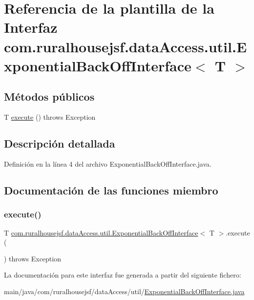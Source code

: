 \hypertarget{a00160}{}\section{Referencia de la plantilla de la Interfaz com.\+ruralhousejsf.\+data\+Access.\+util.\+Exponential\+Back\+Off\+Interface$<$ T $>$}
\label{a00160}
\subsection*{Métodos públicos}
\begin{DoxyCompactItemize}
\item 
T \mbox{\hyperlink{a00160_accad03b4334d95d38315690d30f80b17}{execute}} ()  throws Exception
\end{DoxyCompactItemize}


\subsection{Descripción detallada}


Definición en la línea 4 del archivo Exponential\+Back\+Off\+Interface.\+java.



\subsection{Documentación de las funciones miembro}
\mbox{\label{a00160_accad03b4334d95d38315690d30f80b17}} 
\subsubsection{\texorpdfstring{execute()}{execute()}}
{\footnotesize\ttfamily T \mbox{\hyperlink{a00160}{com.\+ruralhousejsf.\+data\+Access.\+util.\+Exponential\+Back\+Off\+Interface}}$<$ T $>$.execute (\begin{DoxyParamCaption}{ }\end{DoxyParamCaption}) throws Exception}



La documentación para este interfaz fue generada a partir del siguiente fichero\+:\begin{DoxyCompactItemize}
\item 
main/java/com/ruralhousejsf/data\+Access/util/\mbox{\hyperlink{a00026}{Exponential\+Back\+Off\+Interface.\+java}}\end{DoxyCompactItemize}
